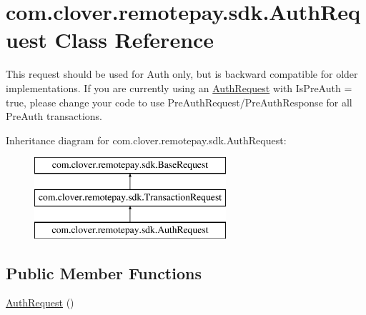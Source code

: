 \hypertarget{classcom_1_1clover_1_1remotepay_1_1sdk_1_1_auth_request}{}\section{com.\+clover.\+remotepay.\+sdk.\+Auth\+Request Class Reference}
\label{classcom_1_1clover_1_1remotepay_1_1sdk_1_1_auth_request}


This request should be used for Auth only, but is backward compatible for older implementations. If you are currently using an \hyperlink{classcom_1_1clover_1_1remotepay_1_1sdk_1_1_auth_request}{Auth\+Request} with Is\+Pre\+Auth = true, please change your code to use Pre\+Auth\+Request/\+Pre\+Auth\+Response for all Pre\+Auth transactions.  


Inheritance diagram for com.\+clover.\+remotepay.\+sdk.\+Auth\+Request\+:\begin{figure}[H]
\begin{center}
\leavevmode
\includegraphics[height=3.000000cm]{classcom_1_1clover_1_1remotepay_1_1sdk_1_1_auth_request}
\end{center}
\end{figure}
\subsection*{Public Member Functions}
\begin{DoxyCompactItemize}
\item 
\hyperlink{classcom_1_1clover_1_1remotepay_1_1sdk_1_1_auth_request_a401d74319332020bca3167a17f12b07c}{Auth\+Request} ()
\end{DoxyCompactItemize}
